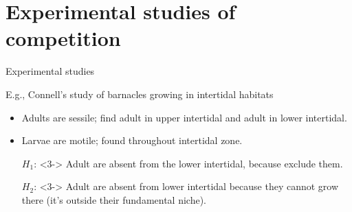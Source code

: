 \begin{frame}[t]
\begin{adjustwidth}{-2em}{-1.5em}
\begin{columns}
        \end{columns}
    \end{adjustwidth}
\end{frame}

\section{Experimental studies of competition}

\begin{frame}[t]
    \begin{adjustwidth}{-2em}{-1.5em}
        Experimental studies

        \vspace{2mm}
        E.g., Connell's study of barnacles growing in intertidal habitats

        \begin{itemize}
            \item<2-> Adults are sessile; find adult  in
                upper intertidal and adult  in lower
                intertidal.

            \item<2-> Larvae are motile; found throughout intertidal zone.

                \vspace{5mm}
            \item[$H_1$:]<3-> Adult  are absent from the lower
                intertidal, because  exclude them.

                \vspace{5mm}
            \item[$H_2$:]<3-> Adult  are absent from lower
                intertidal because they cannot grow there (it's outside
                their fundamental niche).
        \end{itemize}

    \end{adjustwidth}
\end{frame}

